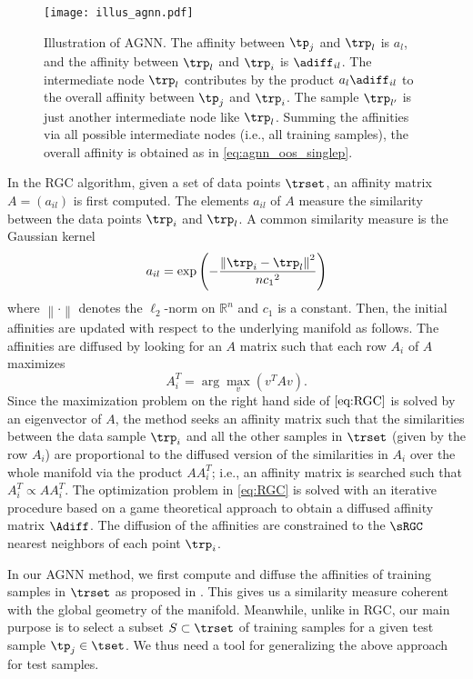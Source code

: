\documentclass[journal]{IEEEtran}
\begin{document}
\begin{figure}[!t]
	\centering
	\texttt{[image: illus\_agnn.pdf]}
	\caption{Illustration of AGNN. The affinity between $\tp_j$ and $\trp_l$ is $a_l$, and the affinity between $\trp_l$ and $\trp_i$ is $\adiff_{il}$. The intermediate node $\trp_l$ contributes by the product $a_l \adiff_{il}$ to the overall affinity between $\tp_j$ and $\trp_i$. The sample $\trp_{l'}$ is just another intermediate node like $\trp_l$. Summing the affinities via all possible intermediate nodes (i.e., all training samples), the overall affinity is obtained as in \eqref{eq:agnn_oos_singlep}.}
	\label{fig:illus_agnn}
\end{figure}




In the RGC algorithm, given a set of data points $\trset$, an affinity matrix $A=(a_{il})$ is first computed. The elements $a_{il}$ of $A$ measure the similarity between the data points $\trp_i$ and $\trp_l$. A common similarity measure is the Gaussian kernel 
\begin{equation}
\label{eq:defn_aff_kernel}
a_{il}=\exp{\left(-\frac{\left\| \trp_{i}- \trp_{l}\right\|^2}{n{c_1}^2}\right)}
\end{equation}
where $\left\| \cdot \right\|$ denotes the $\ell_2$-norm on $\mathbb{R}^n$ and $c_1$ is a constant. Then, the initial affinities are updated with respect to the underlying manifold as follows. The affinities are diffused by looking for an $A$ matrix such that each row $A_i$ of $A$ maximizes 
\begin{equation}
\label{eq:RGC}
A_i^T = \arg \max_v (v^T A v).
\end{equation} 
Since the maximization problem on the right hand side of $\eqref{eq:RGC}$ is solved by an eigenvector of $A$, the method seeks an affinity matrix such that the similarities between the data sample $\trp_i$ and all the other samples in $\trset$ (given by the row $A_i$) are proportional to the diffused version of the similarities in $A_i$ over the whole manifold via the product $A A_i^T$; i.e., an affinity matrix is searched such that $A_i^T  \propto A A_i^T$. The optimization problem in \eqref{eq:RGC} is solved with an iterative procedure based on a game theoretical approach to obtain a diffused affinity matrix $\Adiff$. The diffusion of the affinities are constrained to the $\sRGC$ nearest neighbors of each point $\trp_i$.


In our AGNN method, we first compute and diffuse the affinities of training samples in $\trset$ as proposed in \cite{Donoser13replicator}. This gives us a similarity measure coherent with the global geometry of the manifold. Meanwhile, unlike in RGC, our main purpose is to select a subset $S \subset \trset$ of training samples for a given test sample $\tp_j \in \tset$. We thus need a tool for generalizing the above approach for test samples. 
\end{document}
